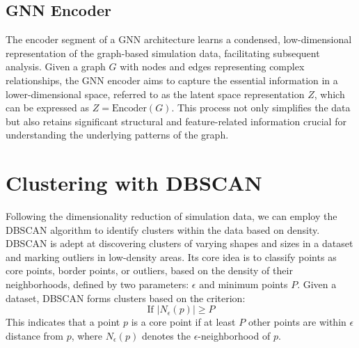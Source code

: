 \subsection{GNN Encoder}
The encoder segment of a GNN architecture learns a condensed, low-dimensional representation of the graph-based simulation data, facilitating subsequent analysis. Given a graph $G$ with nodes and edges representing complex relationships, the GNN encoder aims to capture the essential information in a lower-dimensional space, referred to as the latent space representation $Z$, which can be expressed as $Z = \text{Encoder}(G)$. This process not only simplifies the data but also retains significant structural and feature-related information crucial for understanding the underlying patterns of the graph.
\section{Clustering with DBSCAN}
Following the dimensionality reduction of simulation data, we can employ the DBSCAN algorithm to identify clusters within the data based on density. DBSCAN is adept at discovering clusters of varying shapes and sizes in a dataset and marking outliers in low-density areas. Its core idea is to classify points as core points, border points, or outliers, based on the density of their neighborhoods, defined by two parameters: $\epsilon$ and minimum points $P$. Given a dataset, DBSCAN forms clusters based on the criterion:
\begin{equation}
\text{If } |N_\epsilon(p)| \geq P
\end{equation}
This indicates that a point $p$ is a core point if at least $P$ other points are within $\epsilon$ distance from $p$, where $N_\epsilon(p)$ denotes the $\epsilon$-neighborhood of $p$.
